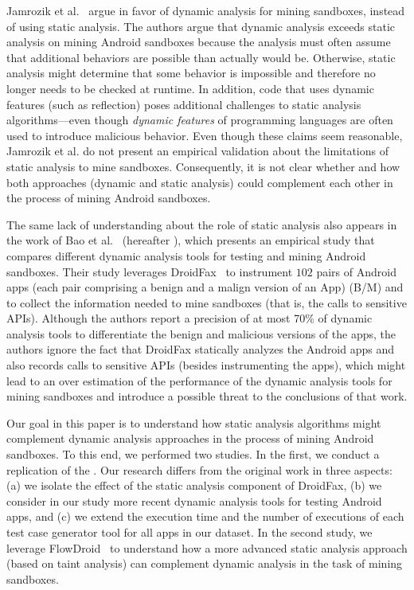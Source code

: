 Jamrozik et al.~\cite{DBLP:conf/icse/JamrozikSZ16} argue in favor of dynamic analysis for mining sandboxes, instead of using static analysis.
The authors argue that dynamic analysis exceeds static analysis on mining Android sandboxes because the analysis must often
assume that additional behaviors are possible than actually would be.
Otherwise, static analysis might determine that some behavior is impossible and therefore no longer needs to be checked at runtime. In addition,
code that uses dynamic features (such as reflection) poses additional challenges to static analysis algorithms---even though \emph{dynamic features}
of programming languages are often used to introduce malicious behavior. Even though these claims
seem reasonable, Jamrozik et al. do not present an empirical validation about the limitations of static analysis to mine sandboxes.
Consequently, it is not clear whether and how both approaches (dynamic and static analysis) could complement each other in the process of mining Android sandboxes.

The same lack of understanding about the role of static analysis also appears in the work of Bao et al.~\cite{DBLP:conf/wcre/BaoLL18} (hereafter \blls), which presents an empirical study that compares different dynamic analysis tools for testing and mining Android sandboxes. Their study leverages DroidFax~\cite{DBLP:conf/icsm/CaiR17a} to instrument $102$ pairs of Android apps (each pair comprising a benign and a malign version of an App) (B/M) and to collect the information needed to mine sandboxes (that is, the calls to sensitive APIs).
Although the authors report a precision of at most 70\% of dynamic analysis tools to differentiate the benign and malicious versions of the apps, the authors ignore the fact that DroidFax statically analyzes the Android apps and also records calls to sensitive APIs (besides instrumenting the apps), which might lead to an over estimation of the performance of the dynamic analysis tools for mining sandboxes and introduce a possible threat to the conclusions of that work.

Our goal in this paper is to understand how static analysis
algorithms might complement dynamic analysis approaches in the process of mining Android sandboxes. To this end, we performed two studies. In the
first, we conduct a replication of the \blls. Our research differs from the original work in three aspects: (a)
we isolate the effect of the static analysis component of DroidFax, (b) we consider in our study more recent dynamic analysis tools for testing Android apps,
and (c) we extend the execution time and the number of executions of each test case generator tool for all apps
in our dataset. In the second study, we leverage FlowDroid~\cite{DBLP:conf/pldi/ArztRFBBKTOM14} to understand how a more advanced static analysis approach
(based on taint analysis) can complement dynamic analysis in the task of mining sandboxes.

